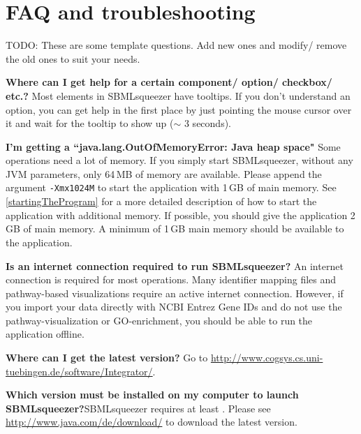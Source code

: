 \chapter{FAQ and troubleshooting}
\label{ch:faq}

TODO: These are some template questions. Add new ones and modify/ remove the
old ones to suit your needs.

\noindent \textbf{Where can I get help for a certain component/ option/ checkbox/ etc.?}\newline
Most elements in SBMLsqueezer have tooltips. If you don't understand an option, you
can get help in the first place by just pointing the mouse cursor over it and
wait for the tooltip to show up ($\sim$ 3 seconds).\newline

\noindent \textbf{I'm getting a ``java.lang.OutOfMemoryError: Java heap space"}\newline
Some operations need a lot of memory. If you simply start SBMLsqueezer, without any
JVM parameters, only 64\,MB of memory are available. Please append the argument
\texttt{-Xmx1024M} to start the application with 1\,GB of main memory. See
\vref{startingTheProgram} for a more detailed description of how to
start the application with additional memory. If possible, you should give the
application 2\,GB of main memory. A minimum of 1\,GB main memory should be
available to the application.\newline

\noindent \textbf{Is an internet connection required to run SBMLsqueezer?}\newline
An internet connection is required for most operations. Many identifier mapping
files and pathway-based visualizations require an active internet connection.
However, if you import your data directly with NCBI Entrez Gene IDs and do not
use the pathway-visualization or GO-enrichment, you should be able to run the
application offline.\newline

\noindent \textbf{Where can I get the latest version?}\newline
Go to \url{http://www.cogsys.cs.uni-tuebingen.de/software/Integrator/}.\newline

\noindent \textbf{Which \Java version must be installed on my computer to launch
SBMLsqueezer?}\newline SBMLsqueezer requires at least . Please see
\url{http://www.java.com/de/download/} to download the latest \Java version.


